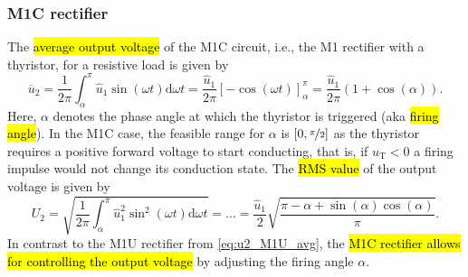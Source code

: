 \begin{frame}
    \frametitle{M1C rectifier}
    The \hl{average output voltage} of the M1C circuit, i.e., the M1 rectifier with a thyristor, for a resistive load is given by
    \begin{equation}
        \overline{u}_2 = \frac{1}{2\pi} \int_{\alpha}^{\pi} \hat{u}_1 \sin(\omega t) \mathrm{d} \omega t = \frac{\hat{u}_1}{2\pi} \left[ -\cos(\omega t) \right]_{\alpha}^{\pi} = \frac{\hat{u}_1}{2\pi} \left( 1 + \cos(\alpha) \right). 
    \end{equation}
    Here, $\alpha$ denotes the phase angle at which the thyristor is triggered (aka \hl{firing angle}). In the M1C case, the feasible range for $\alpha$ is $[0,\nicefrac{\pi}{2}]$ as the thyristor requires a positive forward voltage to start conducting, that is, if $u_\mathrm{T}<0$ a firing impulse would not change its conduction state. The \hl{RMS value} of the output voltage is given by
    \begin{equation}
        U_2 = \sqrt{\frac{1}{2\pi} \int_{\alpha}^{\pi} \hat{u}_1^2 \sin^2(\omega t) \mathrm{d} \omega t} =   \ldots = \frac{\hat{u}_1}{2} \sqrt{\frac{\pi - \alpha + \sin(\alpha)\cos(\alpha)}{\pi}}.
    \end{equation}
    In contrast to the M1U rectifier from \eqref{eq:u2_M1U_avg}, the \hl{M1C rectifier allows for controlling the output voltage} by adjusting the firing angle $\alpha$.
\end{frame}

